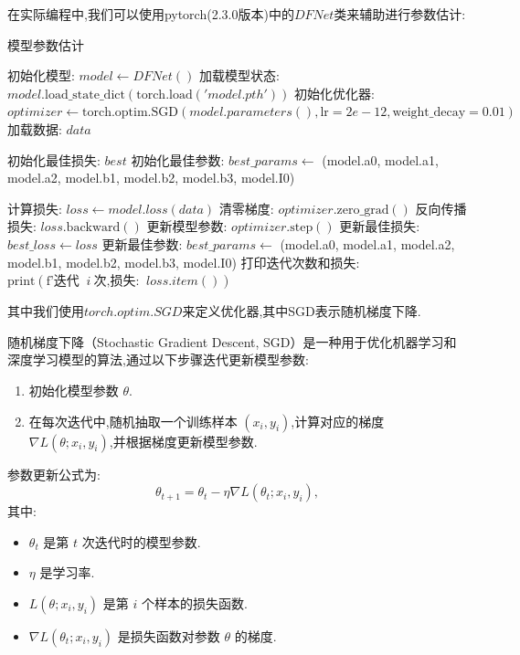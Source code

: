 在实际编程中,我们可以使用pytorch(2.3.0版本)中的$DFNet$类来辅助进行参数估计:
 \begin{algorithm}[H]
        \caption{模型参数估计}
        \begin{algorithmic}[1]
            \State 初始化模型: $model \leftarrow DFNet()$
            \State 加载模型状态: $model.\text{load\_state\_dict}(\text{torch.load}('model.pth'))$
            \State 初始化优化器: $optimizer \leftarrow \text{torch.optim.SGD}(model.parameters(), \text{lr}=2e-12, \text{weight\_decay}=0.01)$
            \State 加载数据: $data$
            
            \State 初始化最佳损失: $best$
            \State 初始化最佳参数: $best\_params \leftarrow$ (model.a0, model.a1, model.a2, model.b1, model.b2, model.b3, model.I0)
            
                \State 计算损失: $loss \leftarrow model.loss(data)$
                \State 清零梯度: $optimizer.\text{zero\_grad}()$
                \State 反向传播损失: $loss.\text{backward}()$
                \State 更新模型参数: $optimizer.\text{step}()$
                    \State 更新最佳损失: $best\_loss \leftarrow loss$
                    \State 更新最佳参数: $best\_params \leftarrow$ (model.a0, model.a1, model.a2, model.b1, model.b2, model.b3, model.I0)
                \EndIf
                \State 打印迭代次数和损失: $\text{print}(\text{f'迭代 } \ i \ \text{次,损失: } \ loss.item())$
            \EndFor
        \end{algorithmic}
    \end{algorithm}
 
    其中我们使用$torch.optim.SGD$来定义优化器,其中SGD表示随机梯度下降. 

随机梯度下降（Stochastic Gradient Descent, SGD）是一种用于优化机器学习和深度学习模型的算法,通过以下步骤迭代更新模型参数:
\begin{enumerate}
    \item 初始化模型参数 $\theta$. 
    \item 在每次迭代中,随机抽取一个训练样本 $(x_i, y_i)$,计算对应的梯度 $\nabla L(\theta; x_i, y_i)$,并根据梯度更新模型参数. 
\end{enumerate}

参数更新公式为:
\begin{equation}
    \theta_{t+1} = \theta_t - \eta \nabla L(\theta_t; x_i, y_i),
\end{equation}
其中:
\begin{itemize}
    \item $\theta_t$ 是第 $t$ 次迭代时的模型参数. 
    \item $\eta$ 是学习率. 
    \item $L(\theta; x_i, y_i)$ 是第 $i$ 个样本的损失函数. 
    \item $\nabla L(\theta_t; x_i, y_i)$ 是损失函数对参数 $\theta$ 的梯度. 
\end{itemize}


